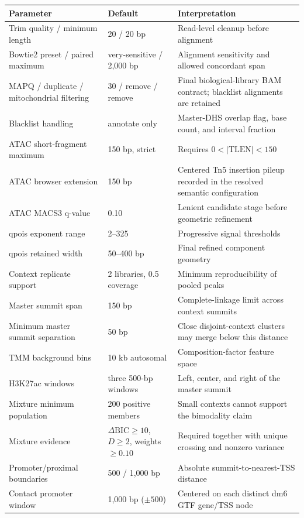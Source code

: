 \documentclass[11pt]{article}
\begin{document}
\begin{longtable}{p{} p{} p{}}
\toprule
Parameter & Default & Interpretation \\
\midrule
\endhead
Trim quality / minimum length & 20 / 20 bp & Read-level cleanup before alignment \\
Bowtie2 preset / paired maximum & very-sensitive / 2,000 bp & Alignment sensitivity and allowed concordant span \\
MAPQ / duplicate / mitochondrial filtering & 30 / remove / remove & Final biological-library BAM contract; blacklist alignments are retained \\
Blacklist handling & annotate only & Master-DHS overlap flag, base count, and interval fraction \\
ATAC short-fragment maximum & 150 bp, strict & Requires \(0<|\mathrm{TLEN}|<150\) \\
ATAC browser extension & 150 bp & Centered Tn5 insertion pileup recorded in the resolved semantic configuration \\
ATAC MACS3 q-value & 0.10 & Lenient candidate stage before geometric refinement \\
qpois exponent range & 2--325 & Progressive signal thresholds \\
qpois retained width & 50--400 bp & Final refined component geometry \\
Context replicate support & 2 libraries, 0.5 coverage & Minimum reproducibility of pooled peaks \\
Master summit span & 150 bp & Complete-linkage limit across context summits \\
Minimum master summit separation & 50 bp & Close disjoint-context clusters may merge below this distance \\
TMM background bins & 10 kb autosomal & Composition-factor feature space \\
H3K27ac windows & three 500-bp windows & Left, center, and right of the master summit \\
Mixture minimum population & 200 positive members & Small contexts cannot support the bimodality claim \\
Mixture evidence & \(\Delta\mathrm{BIC}\geq10\), \(D\geq2\), weights \(\geq0.10\) & Required together with unique crossing and nonzero variance \\
Promoter/proximal boundaries & 500 / 1,000 bp & Absolute summit-to-nearest-TSS distance \\
Contact promoter window & 1,000 bp ($\pm500$) & Centered on each distinct dm6 GTF gene/TSS node \\

\end{longtable}
\end{document}
